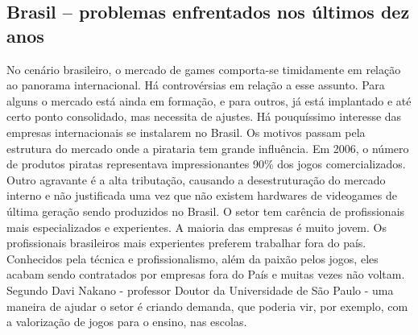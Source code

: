 \subsection{Brasil – problemas enfrentados nos últimos dez anos}
%
No cenário brasileiro, o mercado de games comporta-se timidamente em relação ao panorama internacional. Há controvérsias em relação a esse assunto. Para alguns o mercado está ainda em formação, e para outros, já está implantado e até certo ponto consolidado, mas necessita de ajustes.
Há pouquíssimo interesse das empresas internacionais se instalarem no Brasil. Os motivos passam pela estrutura do mercado onde a pirataria tem grande influência. Em 2006, o número de produtos piratas representava impressionantes 90\% \cite{GEDIGames} dos jogos comercializados. Outro agravante é a alta tributação, causando a desestruturação do mercado interno e não justificada uma vez que não existem hardwares de videogames de última geração sendo produzidos no Brasil. 
O setor tem carência de profissionais mais especializados e experientes. A maioria das empresas é muito jovem. Os profissionais brasileiros mais experientes preferem trabalhar fora do país. Conhecidos pela técnica e profissionalismo, além da paixão pelos jogos, eles acabam sendo contratados por empresas fora do País e muitas vezes não voltam.
Segundo Davi Nakano - professor Doutor da Universidade de São Paulo - uma maneira de ajudar o setor é criando demanda, que poderia vir, por exemplo, com a valorização de jogos para o ensino, nas escolas.
%
